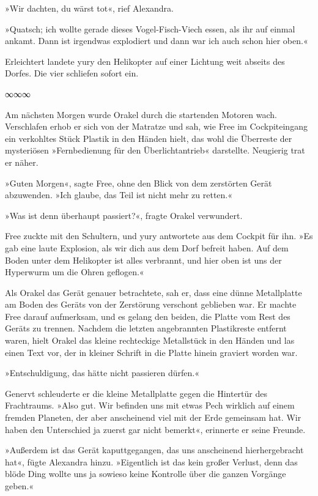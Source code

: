 »Wir dachten, du wärst tot«, rief Alexandra.

»Quatsch; ich wollte gerade dieses Vogel-Fisch-Viech essen, als ihr auf einmal ankamt. Dann ist irgendwas explodiert und dann war ich auch schon hier oben.«

Erleichtert landete yury den Helikopter auf einer Lichtung weit abseits des Dorfes. Die vier schliefen sofort ein.

\begin{center}
    ∞∞∞
\end{center}

Am nächsten Morgen wurde Orakel durch die startenden Motoren wach. Verschlafen erhob er sich von der Matratze und sah, wie Free im Cockpiteingang ein verkohltes Stück Plastik in den Händen hielt, das wohl die Überreste der mysteriösen »Fernbedienung für den Überlichtantrieb« darstellte. Neugierig trat er näher.

»Guten Morgen«, sagte Free, ohne den Blick von dem zerstörten Gerät abzuwenden. »Ich glaube, das Teil ist nicht mehr zu retten.«

»Was ist denn überhaupt passiert?«, fragte Orakel verwundert.

Free zuckte mit den Schultern, und yury antwortete aus dem Cockpit für ihn. »Es gab eine laute Explosion, als wir dich aus dem Dorf befreit haben. Auf dem Boden unter dem Helikopter ist alles verbrannt, und hier oben ist uns der Hyperwurm um die Ohren geflogen.«

Als Orakel das Gerät genauer betrachtete, sah er, dass eine dünne Metallplatte am Boden des Geräts von der Zerstörung verschont geblieben war. Er machte Free darauf aufmerksam, und es gelang den beiden, die Platte vom Rest des Geräts zu trennen. Nachdem die letzten angebrannten Plastikreste entfernt waren, hielt Orakel das kleine rechteckige Metallstück in den Händen und las einen Text vor, der in kleiner Schrift in die Platte hinein graviert worden war.

»Entschuldigung, das hätte nicht passieren dürfen.«

Genervt schleuderte er die kleine Metallplatte gegen die Hintertür des Frachtraums. »Also gut. Wir befinden uns mit etwas Pech wirklich auf einem fremden Planeten, der aber anscheinend viel mit der Erde gemeinsam hat. Wir haben den Unterschied ja zuerst gar nicht bemerkt«, erinnerte er seine Freunde.

»Außerdem ist das Gerät kaputtgegangen, das uns anscheinend hierhergebracht hat«, fügte Alexandra hinzu. »Eigentlich ist das kein großer Verlust, denn das blöde Ding wollte uns ja sowieso keine Kontrolle über die ganzen Vorgänge geben.«

